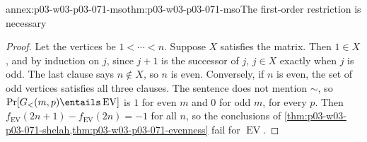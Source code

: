 \begin{annexitem}{annex:p03-w03-p03-071-mso}{thm:p03-w03-p03-071-mso}{The first-order restriction is necessary}
\begin{proof}
Let the vertices be \(1<\cdots<n\).  Suppose \(X\) satisfies the matrix.
Then \(1\in X\), and by induction on \(j\), since \(j+1\) is the successor
of \(j\), \(j\in X\) exactly when \(j\) is odd.  The last clause says
\(n\notin X\), so \(n\) is even.  Conversely, if \(n\) is even, the set of
odd vertices satisfies all three clauses.  The sentence does not mention
\(\sim\), so \(\Pr[G_<(m,p)\entails\operatorname{EV}]\) is \(1\) for even
\(m\) and \(0\) for odd \(m\), for every \(p\).  Then
\(f_{\operatorname{EV}}(2n+1)-f_{\operatorname{EV}}(2n)=-1\) for all \(n\),
so the conclusions of \cref{thm:p03-w03-p03-071-shelah,thm:p03-w03-p03-071-evenness}
fail for \(\operatorname{EV}\).
\end{proof}
\end{annexitem}
